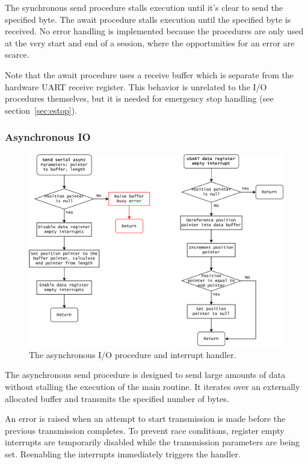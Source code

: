 \documentclass{article}
\begin{document}
	The synchronous send procedure stalls execution until it's clear to send
	the specified byte. The await procedure stalls execution until the
	specified byte is received. No error handling is implemented because the
	procedures are only used at the very start and end of a session, where the
	opportunities for an error are scarce.
	
	Note that the await procedure uses a receive buffer which is separate from
	the hardware UART receive register. This behavior is unrelated to the I/O
	procedures themselves, but it is needed for emergency stop handling (see
	section~\ref{sec:estop}).
	
	\newpage
	\subsubsection{Asynchronous IO}
	
	\begin{figure}[h]
		\includegraphics[width=\linewidth]{img/async}
		\caption{The asynchronous I/O procedure and interrupt handler.}
	\end{figure}
	
	The asynchronous send procedure is designed to send large amounts of data
	without stalling the execution of the main routine. It iterates over an
	externally allocated buffer and transmits the specified number of bytes.
	
	An error is raised when an attempt to start transmission is made before the
	previous transmission completes. To prevent race conditions, register empty
	interrupts are temporarily disabled while the transmission parameters are
	being set. Reenabling the interrupts immediately triggers the handler.
	
\end{document}
